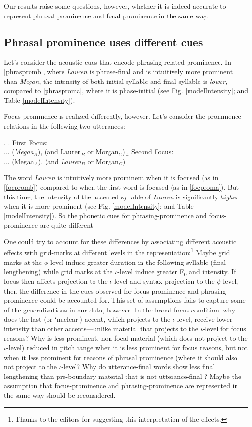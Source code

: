 \documentclass[preprint,review,12pt,authoryear,times]{elsarticle}
\begin{document}
Our results raise some questions, however, whether it is indeed accurate to represent phrasal prominence and focal prominence in the same way. 


\subsection{Phrasal prominence uses different cues}

Let's consider the acoustic cues that encode phrasing-related  prominence.  In \ref{phraspromb}, where {\em Lauren} is phrase-final and is intuitively more prominent than {\em Megan}, the intensity of both initial syllable and final syllable is {\em lower}, compared to \ref{phrasproma}, where it is phase-initial (see Fig. \ref{modelIntensity}; and Table \ref{modelIntensity}).  

Focus prominence is realized differently, however. Let's consider the prominence relations in the following two utterances:

\ex.\label{focprom}
\a. First Focus:\\
 ... ({\em Megan}$_A$), (and {Lauren}$_B$ or Morgan$_C$)\label{focproma}
\b. Second Focus:\\
... (Megan$_A$), (and {\em Lauren}$_B$ or Morgan$_C$) \label{focpromb}

The word {\em Lauren} is intuitively more prominent when it is focused (as in \ref{focpromb}) compared to when the first word is focused (as in \ref{focproma}). But this time, the intensity of the accented syllable of {\em Lauren} is significantly {\em higher} when it is more prominent (see Fig. \ref{modelIntensity}; and Table \ref{modelIntensity}). So the phonetic cues for phrasing-prominence and focus-prominence are quite different. 

One could try to account for these differences by associating different acoustic effects with grid-marks at different levels in the representation:\footnote{Thanks to the editors for suggesting this interpretation of the effects.} Maybe grid marks at the $\phi$-level induce greater duration in the following syllable (final lengthening) while grid marks at the $\iota$-level induce greater F$_0$ and intensity. If focus then affects projection to the $\iota$-level and syntax projection to the $\phi$-level, then the difference in the cues observed for focus-prominence and phrasing-prominence could be accounted for. This set of assumptions fails to capture some of the generalizations in our data, however. In the broad focus condition, why does the last (or `nuclear') accent, which projects to the $\iota$-level, receive lower intensity than other accents---unlike material that projects to the $\iota$-level for focus reasons? Why is less prominent, non-focal material (which does not project to the $\iota$-level) reduced in pitch range when it is less prominent for focus reasons, but not when it less prominent for reasons of phrasal prominence (where it should also not project to the $\iota$-level?  Why do utterance-final words show less final lengthening than pre-boundary material that is not utterance-final \citep{wagner05recursion}? Maybe the assumption that focus-prominence and phrasing-prominence are represented in the same way should be reconsidered.
\end{document}
